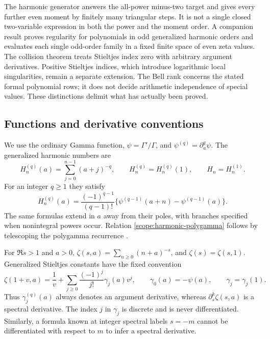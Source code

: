 The harmonic generator answers the all-power minus-two target and
gives every further even moment by finitely many triangular steps.
It is not a single closed two-variable expression in both the power
and the moment order. A companion result proves regularity for
polynomials in odd generalized harmonic orders and evaluates each
single odd-order family in a fixed finite space of even zeta values.
The collision theorem treats Stieltjes index
zero with arbitrary argument derivatives. Positive Stieltjes indices,
which introduce logarithmic local singularities, remain a separate
extension. The Bell rank concerns the stated formal polynomial rows;
it does not decide arithmetic independence of special values.
These distinctions delimit what has actually been proved.

\subsection{Functions and derivative conventions}

We use the ordinary Gamma function, $\psi=\Gamma'/\Gamma$, and
$\psi^{(q)}=\partial_a^q\psi$. The generalized harmonic numbers are
\[
 H_n^{(q)}(a)=\sum_{j=0}^{n-1}(a+j)^{-q},\qquad
 H_n^{(q)}=H_n^{(q)}(1),\qquad H_n=H_n^{(1)}.
\]
For an integer $q\ge1$ they satisfy
\begin{equation}\label{scope:harmonic-polygamma}
 H_n^{(q)}(a)=\frac{(-1)^{q-1}}{(q-1)!}
       \bigl\{\psi^{(q-1)}(a+n)-\psi^{(q-1)}(a)\bigr\}.
\end{equation}
The same formulas extend in $a$ away from their poles, with branches
specified when nonintegral powers occur. Relation
\eqref{scope:harmonic-polygamma} follows by telescoping the polygamma
recurrence \cite{DLMFPolygamma}.

For $\Re s>1$ and $a>0$,
$\zeta(s,a)=\sum_{n\ge0}(n+a)^{-s}$, and
$\zeta(s)=\zeta(s,1)$. Generalized Stieltjes constants have the
fixed convention
\begin{equation}\label{scope:Stieltjes}
 \zeta(1+v,a)=\frac1v+
       \sum_{j\ge0}\frac{(-1)^j}{j!}\gamma_j(a)v^j,
 \qquad \gamma_0(a)=-\psi(a),\qquad\gamma_j=\gamma_j(1).
\end{equation}
Thus $\gamma_j^{(q)}(a)$ always denotes an argument derivative,
whereas $\partial_s^k\zeta(s,a)$ is a spectral derivative.
The index $j$ in $\gamma_j$ is discrete and is never differentiated.
Similarly, a formula known at integer spectral labels $s=-m$ cannot
be differentiated with respect to $m$ to infer a spectral derivative.

